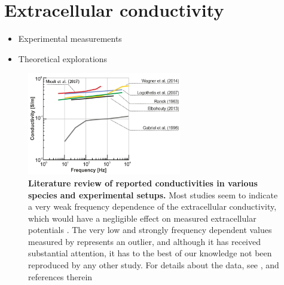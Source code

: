 \section{Extracellular conductivity}
\label{sec:conductivity}

\begin{itemize}
\item Experimental measurements \citep{Miceli2017}
\item Theoretical explorations \citep{Meffin2012,Tahayori2012,Meffin2014,Tahayori2014}
\end{itemize}

\begin{figure}[!ht]
\begin{center}
\includegraphics[width=0.6\textwidth]{Figures/Sigma/frequency_dependence.png}
\end{center}
\caption{\textbf{Literature review of reported conductivities in various species and experimental setups.} 
Most studies seem to indicate a very weak frequency dependence of the extracellular conductivity, which would have a negligible effect on measured extracellular potentials \citep{Miceli2017}. The very low and strongly frequency dependent values measured by \cite{Gabriel1996} represents an outlier, and although it has received substantial attention, it has to the best of our knowledge not been reproduced by any other study.
For details about the data, see \cite{Miceli2017}, and references therein \citep{Ranck1963, Gabriel1996, Logothetis2007, Elbohouty2013, Wagner2014}
}
\label{Sigma:fig:freq_dep}
\end{figure}


